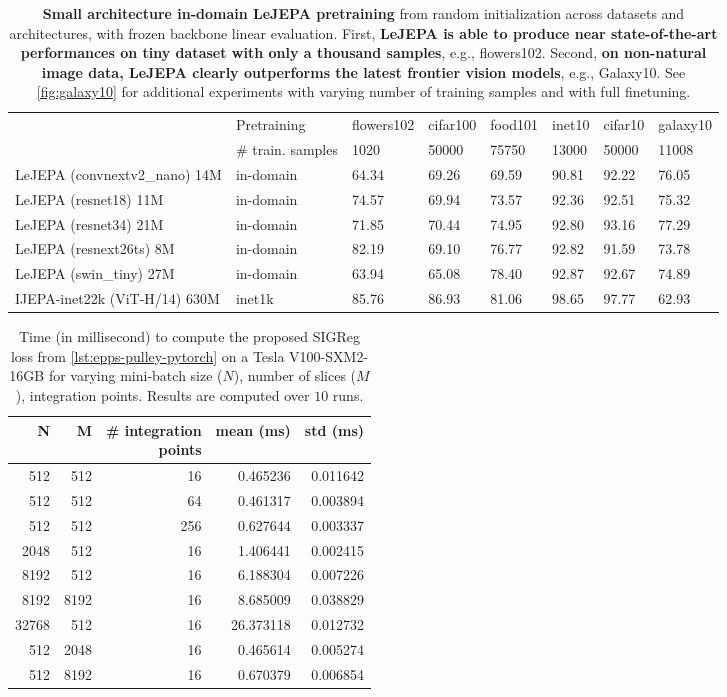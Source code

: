 \begin{table}[t!]
\caption{{\bf Small architecture in-domain LeJEPA pretraining} from random initialization across datasets and architectures, with frozen backbone linear evaluation. First, {\bf LeJEPA is able to produce near state-of-the-art performances on tiny dataset with only a thousand samples}, e.g., flowers102. Second, {\bf on non-natural image data, LeJEPA clearly outperforms the latest frontier vision models}, e.g., Galaxy10. See \cref{fig:galaxy10} for additional experiments with varying number of training samples and with full finetuning.}
\label{tab:in_domain}
\begin{tabular}{llllllll}
\toprule
 & Pretraining & flowers102 & cifar100 & food101 & inet10 & cifar10 & galaxy10 \\
 & \# train. samples & 1020 & 50000 & 75750 & 13000 & 50000 & 11008 \\
\midrule
LeJEPA (convnextv2\_nano) 14M & in-domain & 64.34 & 69.26 & 69.59 & 90.81 & 92.22 & 76.05 \\
LeJEPA (resnet18) 11M & in-domain & 74.57 & 69.94 & 73.57 & 92.36 & 92.51 & 75.32 \\
LeJEPA (resnet34) 21M & in-domain & 71.85 & 70.44 & 74.95 & 92.80 & 93.16 & 77.29 \\
LeJEPA (resnext26ts) 8M & in-domain & 82.19 & 69.10 & 76.77 & 92.82 & 91.59 & 73.78 \\
LeJEPA (swin\_tiny) 27M & in-domain & 63.94 & 65.08 & 78.40 & 92.87 & 92.67 & 74.89 \\
IJEPA-inet22k (ViT-H/14) 630M & inet1k & 85.76 & 86.93 & 81.06 & 98.65 & 97.77 & 62.93
\end{tabular}
\end{table}



\begin{table}[t!]
    \centering
    \setlength{\tabcolsep}{0.5em}
    \caption{Time (in millisecond) to compute the proposed SIGReg loss from \cref{lst:epps-pulley-pytorch} on a Tesla V100-SXM2-16GB for varying mini-batch size ($N$), number of slices ($M$), integration points. Results are computed over $10$ runs.}
    \label{tab:times}
    \begin{tabular}{rrrrr}
\toprule
N & M & \makecell{\# integration \\ points} & mean (ms) & std (ms) \\
\midrule
 512 & 512 &  16 & 0.465236 & 0.011642 \\
 512 & 512 &  64 & 0.461317 & 0.003894 \\
 512 & 512 &  256 & 0.627644 & 0.003337 \\
 2048 & 512 &  16 & 1.406441 & 0.002415 \\
 8192 & 512 &  16 & 6.188304 & 0.007226 \\
 8192 & 8192 &  16 & 8.685009 & 0.038829 \\
 32768 & 512 &  16 & 26.373118 & 0.012732 \\
 512 & 2048 &  16 & 0.465614 & 0.005274 \\
 512 & 8192 &  16 & 0.670379 & 0.006854 \\
\bottomrule
\end{tabular}
\end{table}


